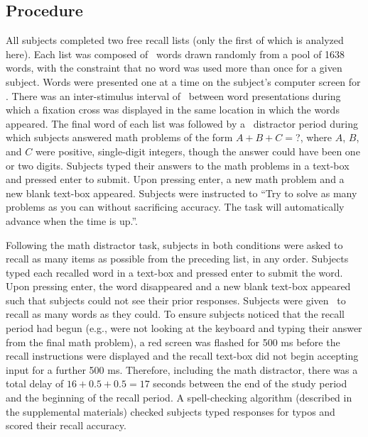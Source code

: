 \documentclass[jou,natbib,floatsintext]{apa6} %
\begin{document}
\subsection{Procedure}
All subjects completed two free recall lists (only the first of which is analyzed here). Each list was composed of \listlength~words drawn randomly from a pool of 1638 words, with the constraint that no word was used more than once for a given subject. Words were presented one at a time on the subject's computer screen for \presrate. 
There was an inter-stimulus interval of \isi~between word presentations during which a fixation cross was displayed in the same location in which the words appeared. The final word of each list was followed by a \DFRDelay~distractor period during which subjects answered math problems of the form $A+B+C=$?, where $A$, $B$, and $C$ were positive, single-digit integers, though the answer could have been one or two digits. Subjects typed their answers to the math problems in a text-box and pressed enter to submit. Upon pressing enter, a new math problem and a new blank text-box appeared. Subjects were instructed to ``Try to solve as many problems as you can without sacrificing accuracy. The task will automatically advance when the time is up.''.

Following the math distractor task, subjects in both conditions were asked to recall as many items as possible from the preceding list, in any order. Subjects typed each recalled word in a text-box and pressed enter to submit the word. Upon pressing enter, the word disappeared and a new blank text-box appeared such that subjects could not see their prior responses. Subjects were given \recalltime~to recall as many words as they could. To ensure subjects noticed that the recall period had begun (e.g., were not looking at the keyboard and typing their answer from the final math problem), a red screen was flashed for 500 ms before the recall instructions were displayed and the recall text-box did not begin accepting input for a further 500 ms. Therefore, including the math distractor, there was a total delay of $16+0.5+0.5=17$ seconds between the end of the study period and the beginning of the recall period. A spell-checking algorithm (described in the supplemental materials) checked subjects typed responses for typos and scored their recall accuracy.
\end{document}
